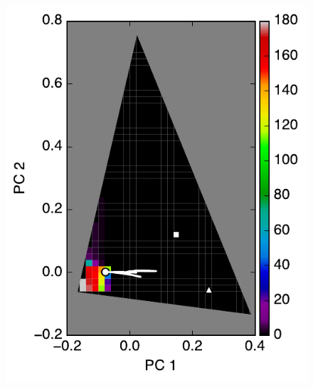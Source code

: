 \documentclass[iop,numberedappendix,apj]{emulateapj}
\begin{document}
\begin{figure}[tbh!]
   \begin{minipage}{0.33\hsize}
    \begin{center}
	\includegraphics[width=\hsize]{mockdata_90deg_3types_t360_lc_noreg_0.pdf}
    \end{center}	
   \end{minipage}
   \begin{minipage}{0.33\hsize}
    \begin{center}

\end{center}
\end{minipage}
\end{figure}
\end{document}
